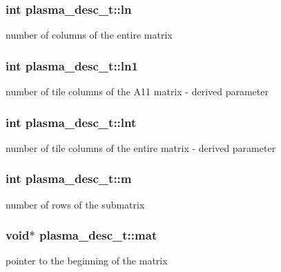 \subsubsection[{ln}]{\setlength{\rightskip}{0pt plus 5cm}int plasma\+\_\+desc\+\_\+t\+::ln}\label{structplasma__desc__t_a0deb48b03bc6427bdd3770aeea1d5f36_a0deb48b03bc6427bdd3770aeea1d5f36}
number of columns of the entire matrix \hypertarget{structplasma__desc__t_a4e8774165bf4ec4a438b46148bf18c7e_a4e8774165bf4ec4a438b46148bf18c7e}{}
\subsubsection[{ln1}]{\setlength{\rightskip}{0pt plus 5cm}int plasma\+\_\+desc\+\_\+t\+::ln1}\label{structplasma__desc__t_a4e8774165bf4ec4a438b46148bf18c7e_a4e8774165bf4ec4a438b46148bf18c7e}
number of tile columns of the A11 matrix -\/ derived parameter \hypertarget{structplasma__desc__t_a47634188eab194b20f78b8c2c32e9582_a47634188eab194b20f78b8c2c32e9582}{}
\subsubsection[{lnt}]{\setlength{\rightskip}{0pt plus 5cm}int plasma\+\_\+desc\+\_\+t\+::lnt}\label{structplasma__desc__t_a47634188eab194b20f78b8c2c32e9582_a47634188eab194b20f78b8c2c32e9582}
number of tile columns of the entire matrix -\/ derived parameter \hypertarget{structplasma__desc__t_a7f9b40af027da0a8f9af989794f31a8a_a7f9b40af027da0a8f9af989794f31a8a}{}
\subsubsection[{m}]{\setlength{\rightskip}{0pt plus 5cm}int plasma\+\_\+desc\+\_\+t\+::m}\label{structplasma__desc__t_a7f9b40af027da0a8f9af989794f31a8a_a7f9b40af027da0a8f9af989794f31a8a}
number of rows of the submatrix \hypertarget{structplasma__desc__t_abcec2c322f8d2461e8afa6c0e7f52220_abcec2c322f8d2461e8afa6c0e7f52220}{}
\subsubsection[{mat}]{\setlength{\rightskip}{0pt plus 5cm}void$\ast$ plasma\+\_\+desc\+\_\+t\+::mat}\label{structplasma__desc__t_abcec2c322f8d2461e8afa6c0e7f52220_abcec2c322f8d2461e8afa6c0e7f52220}
pointer to the beginning of the matrix \hypertarget{structplasma__desc__t_a8512ed221aec5b7db0e31d02acc5b5c7_a8512ed221aec5b7db0e31d02acc5b5c7}{}
